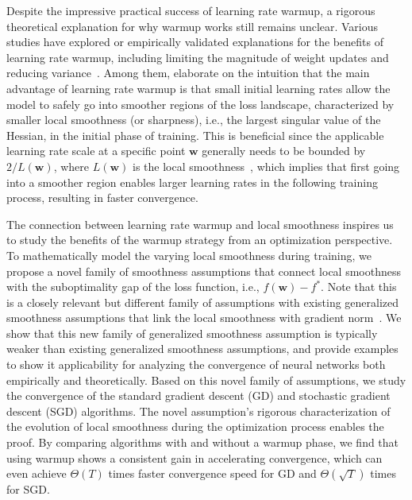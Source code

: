 \documentclass{article}
\newcommand{\bw}{\mathbf{w}}
\begin{document}
Despite the impressive practical success of learning rate warmup, a rigorous theoretical explanation for why warmup works still remains unclear. 
Various studies have explored or empirically validated explanations for the benefits of learning rate warmup, including limiting the magnitude of weight updates and reducing variance~\citep{gotmare2018closer,liu2020variance,gilmer2022loss,kalra2024warmup,kosson2024analyzing}.
Among them, \cite{gilmer2022loss,kalra2024warmup} elaborate on the intuition that the main advantage of learning rate warmup is that small initial learning rates allow the model to safely go into smoother regions of the loss landscape, characterized by smaller local smoothness (or sharpness), i.e., the largest singular value of the Hessian, in the initial phase of training.
This is beneficial since the applicable learning rate scale at a specific point $\bw$ generally needs to be bounded by $2 / L(\bw)$, where $L(\bw)$ is the local smoothness~\citep{cohen2021gradient}, which implies that first going into a smoother region enables larger learning rates in the following training process, resulting in faster convergence.

The connection between learning rate warmup and local smoothness inspires us to study the benefits of the warmup strategy from an optimization perspective.
To mathematically model the varying local smoothness during training, we propose a novel family of smoothness assumptions that connect local smoothness with the suboptimality gap of the loss function, i.e., $f(\bw) - f^*$. Note that this is a closely relevant but different family of assumptions with existing generalized smoothness assumptions that link the local smoothness with gradient norm~\citep{zhang2020gradient,li2023convex}.
We show that this new family of generalized smoothness assumption is typically weaker than existing generalized smoothness assumptions, and provide examples to show it applicability for analyzing the convergence of neural networks both empirically and theoretically.
Based on this novel family of assumptions, we study the convergence of the standard gradient descent (GD) and stochastic gradient descent (SGD) algorithms. The novel assumption's rigorous characterization of the evolution of local smoothness during the optimization process enables the proof. By comparing algorithms with and without a warmup phase, we find that using warmup shows a consistent gain in accelerating convergence, which can even achieve $\Theta(T)$ times faster convergence speed for GD and $\Theta(\sqrt{T})$ times for SGD.
\end{document}
